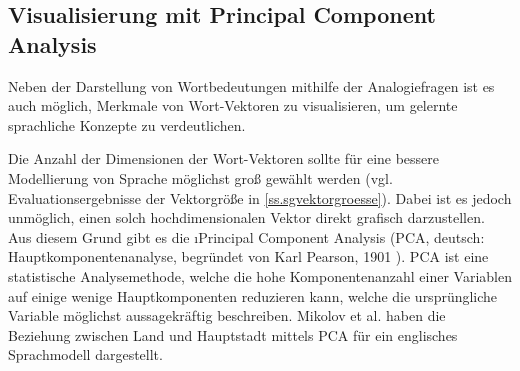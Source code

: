 \subsection{Visualisierung mit Principal Component Analysis}\label{ss.pca}
Neben der Darstellung von Wortbedeutungen mithilfe der Analogiefragen ist es auch möglich, Merkmale von Wort-Vektoren zu visualisieren, um gelernte sprachliche Konzepte zu verdeutlichen.

Die Anzahl der Dimensionen der Wort-Vektoren sollte für eine bessere Modellierung von Sprache möglichst groß gewählt werden (vgl. Evaluationsergebnisse der Vektorgröße in \autoref{ss.sgvektorgroesse}). Dabei ist es jedoch unmöglich, einen solch hochdimensionalen Vektor direkt grafisch darzustellen. Aus diesem Grund gibt es die \i{Principal Component Analysis} (PCA, deutsch: Hauptkomponentenanalyse, begründet von Karl Pearson, 1901 \citep{Pearson1901}). PCA ist eine statistische Analysemethode, welche die hohe Komponentenanzahl einer Variablen auf einige wenige Hauptkomponenten reduzieren kann, welche die ursprüngliche Variable möglichst aussagekräftig beschreiben. Mikolov et al. \citep{Mikolov2013Dist} haben die Beziehung zwischen Land und Hauptstadt mittels PCA für ein englisches Sprachmodell dargestellt.

